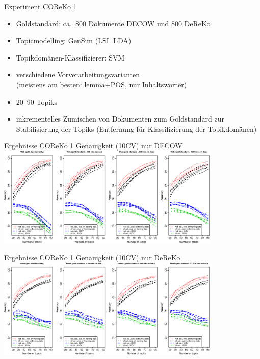 \begin{frame}
  {Experiment COReKo 1}
  \begin{itemize}
    \item Goldstandard: ca.\ 800 Dokumente DECOW und 800 DeReKo
    \item Topicmodelling: GenSim (LSI. LDA)
    \item Topikdomänen-Klassifizierer: SVM
    \item verschiedene Vorverarbeitungsvarianten\\
      (meistens am besten: lemma+POS, nur Inhaltswörter)
    \item 20--90 Topiks
    \item inkrementelles Zumischen von Dokumenten zum Goldstandard zur Stabilisierung der Topiks (Entfernung für Klassifizierung der Topikdomänen)
  \end{itemize}
\end{frame}

\begin{frame}
  {Ergebnisse COReKo 1}
  Genauigkeit (10CV) nur DECOW\\
  \centering
  \vspace{0.5cm}
  \includegraphics[width=0.8\textwidth]{graphics/cow}
\end{frame}

\begin{frame}
  {Ergebnisse COReKo 1}
  Genauigkeit (10CV) nur DeReKo\\
  \centering
  \vspace{0.5cm}
  \includegraphics[width=0.8\textwidth]{graphics/dereko}
\end{frame}

